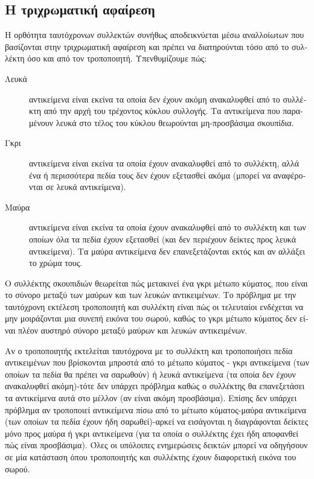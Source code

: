 \begin{greek}
\subsection{Η τριχρωματική αφαίρεση}
Η ορθότητα ταυτόχρονων συλλεκτών συνήθως αποδεικνύεται μέσω
αναλλοίωτων που βασίζονται στην τριχρωματική αφαίρεση και
πρέπει να διατηρούνται τόσο από το συλλέκτη όσο και από τον
τροποποιητή. Υπενθυμίζουμε πώς:

\begin{description}
  \item[Λευκά] αντικείμενα είναι εκείνα τα οποία δεν έχουν
    ακόμη ανακαλυφθεί από το συλλέκτη από την αρχή του
    τρέχοντος κύκλου συλλογής. Τα αντικείμενα που παραμένουν
    λευκά στο τέλος του κύκλου θεωρούνται μη-προσβάσιμα
    σκουπίδια.
  \item[Γκρι] αντικείμενα είναι εκείνα τα οποία έχουν ανακαλυφθεί
     από το συλλέκτη, αλλά ένα ή περισσότερα πεδία τους δεν
     έχουν εξετασθεί ακόμα (μπορεί να αναφέρονται σε λευκά
     αντικείμενα).
  \item[Μαύρα] αντικείμενα είναι εκείνα τα οποία έχουν ανακαλυφθεί
     από το συλλέκτη και των οποίων όλα τα πεδία έχουν εξετασθεί
     (και δεν περιέχουν δείκτες προς λευκά αντικείμενα). Τα
     μαύρα αντικείμενα δεν επανεξετάζονται εκτός και αν αλλάξει
     το χρώμα τους.
\end{description}

Ο συλλέκτης σκουπιδιών θεωρείται πώς μετακινεί ένα γκρι μέτωπο
κύματος, που είναι το σύνορο μεταξύ των μαύρων και των λευκών
αντικειμένων. Το πρόβλημα με την ταυτόχρονη εκτέλεση τροποποιητή
και συλλέκτη είναι πώς οι τελευταίοι ενδέχεται να μην μοιράζονται
μια συνεπή εικόνα του σωρού, καθώς το γκρι μέτωπο κύματος δεν
είναι πλέον αυστηρό σύνορο μεταξύ μαύρων και λευκών αντικειμένων.

Αν ο τροποποιητής εκτελείται ταυτόχρονα με το συλλέκτη και
τροποποιήσει πεδία αντικειμένων που βρίσκονται μπροστά από το
μέτωπο κύματος - γκρι αντικείμενα (των οποίων τα πεδία θα πρέπει
να σαρωθούν) ή λευκά αντικείμενα (τα οποία δεν έχουν ανακαλυφθεί 
ακόμη)-τότε δεν υπάρχει πρόβλημα καθώς ο συλλέκτης θα επανεξετάσει
τα αντικείμενα αυτά στο μέλλον (αν είναι ακόμη προσβάσιμα). 
Επίσης δεν υπάρχει πρόβλημα αν τροποποιεί αντικείμενα πίσω από
το μέτωπο κύματος-μαύρα αντικείμενα (των οποίων τα πεδία έχουν
ήδη σαρωθεί)-αρκεί να εισάγονται η διαγράφονται δείκτες μόνο
προς μαύρα ή γκρι αντικείμενα (για τα οποία ο συλλέκτης έχει
ήδη αποφανθεί πώς είναι προσβάσιμα). Όλες οι υπόλοιπες ενημερώσεις
δεικτών μπορεί να οδηγήσουν σε μία κατάσταση όπου τροποποιητής
και συλλέκτης έχουν διαφορετική εικόνα του σωρού.


\end{greek}
